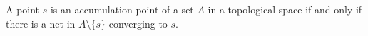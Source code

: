 A point $s$ is an accumulation point of a set $A$ in a topological space if and only if there is a net in $A \setminus \{s\}$ converging to $s$.

